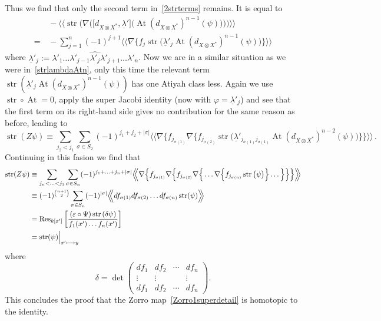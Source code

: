 \documentclass{compositio}
\theoremstyle{definition}
\numberwithin{equation}{section}
\DeclareMathOperator{\str}{str}
\DeclareMathOperator{\At}{At}
\begin{document}
Thus we find that only the second term in~\eqref{2strterms} remains. It is equal to 
\begin{align}
& \, -\Big\langle\!\!\Big\langle \str\Big( \nabla \Big( \big[ d_{X\otimes X^*}, \underline\lambda' \big] \big(\At(d_{X\otimes X^*})^{n-1}(\psi) \big) \Big)\Big) \Big\rangle\!\!\Big\rangle \nonumber \\
= & \, -\sum_{j=1}^n (-1)^{j+1} \Big\langle\!\!\Big\langle \nabla \Big\{ f_j \str\big( \underline\lambda'_j \At(d_{X\otimes X^*})^{n-1}(\psi) \big) \Big\} \Big\rangle\!\!\Big\rangle \label{sumfj}
\end{align}
where $\underline\lambda'_j := \lambda'_1\ldots \lambda'_{j-1} \widehat{\lambda'_j}\lambda'_{j+1}\ldots\lambda'_n$. Now we are in a similar situation as we were in~\eqref{strlambdaAtn}, only this time the relevant term $\str( \underline\lambda'_j \At(d_{X\otimes X^*})^{n-1}(\psi))$ has one Atiyah class less. Again we use $\str\circ \At=0$, apply the super Jacobi identity (now with $\varphi=\underline\lambda'_j$) and see that the first term on its right-hand side gives no contribution for the same reason as before, leading to
$$
\str(Z\psi) \equiv \sum_{j_2<j_1} \sum_{\sigma\in S_2} (-1)^{j_1+j_2 + |\sigma|} 
\Big\langle\!\!\Big\langle \nabla \Big\{ f_{j_{\sigma(1)}} \nabla \Big\{ f_{j_{\sigma(2)}} \str\big( \underline\lambda'_{j_{\sigma(1)} j_{\sigma(1)}} \At(d_{X\otimes X^*})^{n-2}(\psi) \big) \Big\} \Big\} \Big\rangle\!\!\Big\rangle \, .
$$
Continuing in this fasion we find that 
\begin{align}
\str(Z\psi) & \equiv \sum_{j_n<\ldots<j_1} \sum_{\sigma\in S_n} (-1)^{j_1+\ldots+j_n + |\sigma|} 
\Big\langle\!\!\Big\langle \nabla \Big\{ f_{j_{\sigma(1)}} \nabla \Big\{ f_{j_{\sigma(2)}} \nabla \Big\{ \ldots \nabla \Big\{ f_{j_{\sigma(n)}} \str\big( \psi \big) \Big\} \ldots \Big\}\Big\} \Big\} \Big\rangle\!\!\Big\rangle \nonumber \\
& \equiv (-1)^{n+1\choose 2} \sum_{\sigma\in S_n} (-1)^{|\sigma|} 
\Big\langle\!\!\Big\langle df_{\sigma(1)} df_{\sigma(2)} \ldots df_{\sigma(n)} \str(\psi) \Big\rangle\!\!\Big\rangle \nonumber \\
& = \Res_{k[x']} \left[ \frac{(\varepsilon\circ\Psi) \str \left( \delta
\psi \right)}{f_1(x')\ldots f_n(x')} \right] \nonumber \\
& = \str(\psi)\Big|_{x'\longmapsto y} \nonumber
\end{align}
where 
$$
\delta = 
\det 
\begin{pmatrix}
df_1 & df_2 & \cdots & df_n \\
\vdots & \vdots & & \vdots \\
df_1 & df_2 & \cdots & df_n 
\end{pmatrix} .
$$
This concludes the proof that the Zorro map~\eqref{Zorro1superdetail} is homotopic to the identity. 
\end{document}
